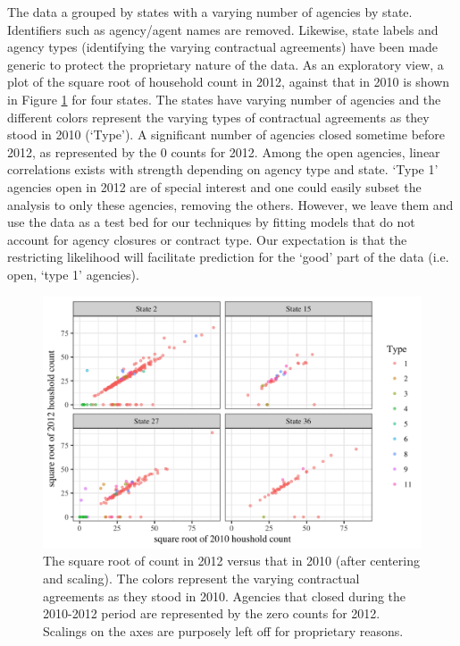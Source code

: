 \documentclass[ba]{imsart}
\begin{document}
The data a grouped by states with a varying number of agencies by state. Identifiers such as agency/agent names are removed. Likewise, state labels and agency types (identifying the varying contractual agreements) have been made generic to protect the proprietary nature of the data.
As an exploratory view, a plot of the square root of household count in 2012, against that in 2010 
is shown in Figure \ref{fig:ctVct} for four states. The states have varying number of agencies and  the different colors represent the varying types of contractual agreements as they stood in 2010 (`Type').  A significant number of agencies closed sometime before 2012, as represented by the $0$ counts for 2012. Among the open agencies, linear correlations exists with strength depending on agency type and state.  `Type 1' agencies open in 2012 are of special interest and one could easily subset the analysis to only these agencies, removing the others. However,  we leave them and use the data as a test bed for our techniques by fitting models that do not account for agency closures or contract type.  Our expectation is that the restricting likelihood will facilitate prediction for the `good' part of the data (i.e. open, `type 1' agencies). 

\begin{figure}[t]
\centering
\includegraphics[width=5in]{scatter_by_state.png}
\caption{The square root of count in 2012 versus that in 2010 (after centering and scaling). The colors represent the varying contractual agreements as they stood in 2010.  Agencies that closed during the 2010-2012 period are represented by the zero counts for 2012. Scalings on the axes are purposely left off for proprietary reasons.}
\label{fig:ctVct}
\end{figure}
\end{document}
